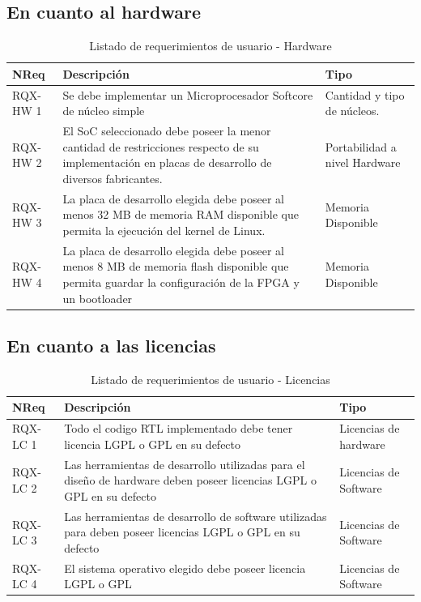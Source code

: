		\subsection{En cuanto al hardware}
		\begin{table}[h]
		\centering
		\begin{tabular}{ p{2.5cm} p{8cm} p{3cm} }
		\hline 
		\rowcolor[gray]{0.8} N\textordmasculine Req & Descripción & Tipo\\
		\hline
		RQX-HW 1 &  Se debe implementar un Microprocesador Softcore de núcleo simple & Cantidad y tipo de núcleos. \\
		\hline
		RQX-HW 2 &  El SoC seleccionado debe poseer la menor cantidad de restricciones respecto de su implementación en placas de desarrollo de diversos
		fabricantes. & Portabilidad a nivel Hardware\\
		\hline
		RQX-HW 3 & La placa de desarrollo elegida debe poseer al menos 32 MB de memoria RAM disponible que permita la ejecución del kernel de Linux. &
		Memoria Disponible\\
		\hline
		RQX-HW 4 & La placa de desarrollo elegida debe poseer al menos 8 MB de memoria flash disponible que permita guardar la configuración de la FPGA y un
		bootloader & Memoria Disponible\\
		\hline
		\end{tabular}
		\caption{Listado de requerimientos de usuario - Hardware}
		\label{tab:requsr1}
		\end{table}
					
		\subsection{En cuanto a las licencias}
		\begin{table}[h]
		\centering
		\begin{tabular}{ p{2.5cm} p{8cm} p{3cm} }
		\hline 
		\rowcolor[gray]{0.8} N\textordmasculine Req & Descripción  & Tipo\\
		\hline 
		RQX-LC 1 &  Todo el codigo RTL implementado debe tener licencia LGPL o GPL en su defecto & Licencias de hardware\\
		\hline 
		RQX-LC 2 &  Las herramientas de desarrollo utilizadas para el diseño de hardware  deben poseer licencias LGPL o GPL en su defecto & Licencias de Software\\
		\hline 
		RQX-LC 3 &  Las herramientas de desarrollo de software utilizadas para deben poseer licencias LGPL o GPL en su defecto & Licencias de Software\\
		\hline
		RQX-LC 4 & El sistema operativo elegido debe poseer licencia LGPL o GPL & Licencias de Software\\
		\hline
		\end{tabular}
		\caption{Listado de requerimientos de usuario - Licencias}
		\label{tab:requsr2}
		\end{table}
		
